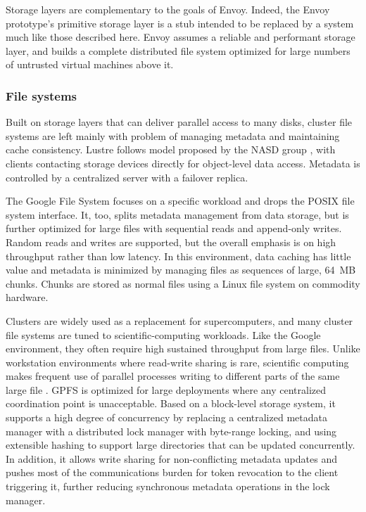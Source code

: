 Storage layers are complementary to the goals of Envoy. Indeed, the Envoy prototype's primitive storage layer is a stub intended to be replaced by a system much like those described here. Envoy assumes a reliable and performant storage layer, and builds a complete distributed file system optimized for large numbers of untrusted virtual machines above it.

\subsubsection{File systems}

Built on storage layers that can deliver parallel access to many disks, cluster file systems are left mainly with problem of managing metadata and maintaining cache consistency. Lustre \cite{lustre} follows model proposed by the NASD group \cite{gibson98a}, with clients contacting storage devices directly for object-level data access. Metadata is controlled by a centralized server with a failover replica.

The Google File System \cite{ghemawat} focuses on a specific workload and drops the POSIX file system interface. It, too, splits metadata management from data storage, but is further optimized for large files with sequential reads and append-only writes. Random reads and writes are supported, but the overall emphasis is on high throughput rather than low latency. In this environment, data caching has little value and metadata is minimized by managing files as sequences of large, 64~MB chunks. Chunks are stored as normal files using a Linux file system on commodity hardware.

Clusters are widely used as a replacement for supercomputers, and many cluster file systems are tuned to scientific-computing workloads. Like the Google environment, they often require high sustained throughput from large files. Unlike workstation environments where read-write sharing is rare, scientific computing makes frequent use of parallel processes writing to different parts of the same large file \cite{wang04}. GPFS \cite{schmuck} is optimized for large deployments where any centralized coordination point is unacceptable. Based on a block-level storage system, it supports a high degree of concurrency by replacing a centralized metadata manager with a distributed lock manager with byte-range locking, and using extensible hashing to support large directories that can be updated concurrently. In addition, it allows write sharing for non-conflicting metadata updates and pushes most of the communications burden for token revocation to the client triggering it, further reducing synchronous metadata operations in the lock manager.

